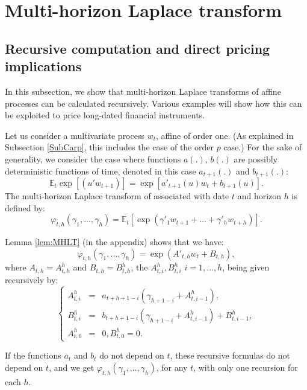 \documentclass[
  12pt,
]{book}
\theoremstyle{definition}
\theoremstyle{definition}
\theoremstyle{definition}
\theoremstyle{definition}
\theoremstyle{remark}
\begin{document}
\hypertarget{MHLT}{%
\section{Multi-horizon Laplace transform}\label{MHLT}}

\hypertarget{recursive-computation-and-direct-pricing-implications}{%
\subsection{Recursive computation and direct pricing implications}\label{recursive-computation-and-direct-pricing-implications}}

In this subsection, we show that multi-horizon Laplace transforms of affine processes can be calculated recursively. Various examples will show how this can be exploited to price long-dated financial instruments.

Let us consider a multivariate process \(w_{t}\), affine of order one. (As explained in Subsection \ref{SubCarp}, this includes the case of the order \(p\) case.) For the sake of generality, we consider the case where functions \(a(.)\), \(b(.)\) are possibly deterministic functions of time, denoted in this case \(a_{t+1}(.)\) and \(b_{t+1}(.)\):
\[
\mathbb{E}_t \exp[(u'w_{t+1})] = \exp[a'_{t+1}(u)w_t+b_{t+1}(u)].
\]
The multi-horizon Laplace transform of associated with date \(t\) and horizon \(h\) is defined by:
\begin{equation}
\varphi_{t,h}(\gamma_1,\dots,\gamma_h) = \mathbb{E}_t[\exp(\gamma'_1w_{t+1}+\dots+\gamma'_h w_{t+h})].\label{eq:multiLT}
\end{equation}

Lemma \ref{lem:MHLT} (in the appendix) shows that we have:
\[
\varphi_{t,h}(\gamma_1,\dots,\gamma_h) = \exp(A'_{t,h} w_t + B_{t,h}),
\]
where \(A_{t,h} = A^h_{t,h}\) and \(B_{t,h} = B^h_{t,h}\), the \(A^h_{t,i}, B^h_{t,i}\) \(i = 1,\dots,h\), being given recursively by:
\[
\left\{
\begin{array}{ccl}
A^h_{t,i} &=& a_{t+h+1-i}(\gamma_{h+1-i} + A^h_{t,i-1}), \\
B^h_{t,i} &=& b_{t+h+1-i}(\gamma_{h+1-i} + A^h_{t,i-1}) + B^h_{t,i-1}, \\
A^h_{t,0} &=& 0, B^h_{t,0} = 0.
\end{array}
\right.
\]

If the functions \(a_{t}\) and \(b_{t}\) do not depend on \(t\), these recursive formulas do not depend on \(t\), and we get \(\varphi_{t,h}(\gamma_1,\dots,\gamma_h)\), for any \(t\), with only one recursion for each \(h\).
\end{document}
